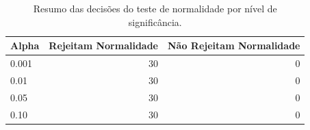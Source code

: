 \begin{table}
\caption{Resumo das decisões do teste de normalidade por nível de significância.}
\label{tab:resumo-normalidade}
\begin{tabular}{lrr}
\toprule
Alpha & Rejeitam Normalidade & Não Rejeitam Normalidade \\
\midrule
0.001 & 30 & 0 \\
0.01 & 30 & 0 \\
0.05 & 30 & 0 \\
0.10 & 30 & 0 \\
\bottomrule
\end{tabular}
\end{table}
